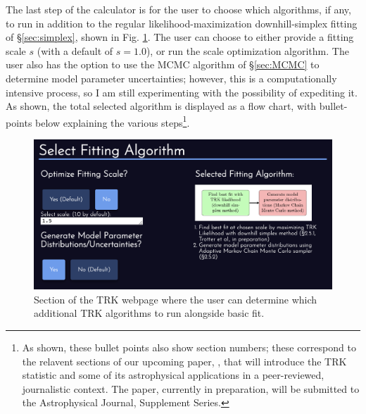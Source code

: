 The last step of the calculator is for the user to choose which algorithms, if any, to run in addition to the regular likelihood-maximization downhill-simplex fitting of \S\ref{sec:simplex}, shown in Fig. \ref{fig:websitechoosealgo}. The user can choose to either provide a fitting scale $s$ (with a default of $s=1.0$), or run the scale optimization algorithm. The user also has the option to use the MCMC algorithm of \S\ref{sec:MCMC} to determine model parameter uncertainties; however, this is a computationally intensive process, so I am still experimenting with the possibility of expediting it. As shown, the total selected algorithm is displayed as a flow chart, with bullet-points below explaining the various steps\footnote{As shown, these bullet points also show section numbers; these correspond to the relavent sections of our upcoming paper, \textcite{TRKIapjs}, that will introduce the TRK statistic and some of its astrophysical applications in a peer-reviewed, journalistic context. The paper, currently in preparation, will be submitted to the Astrophysical Journal, Supplement Series.}.
\begin{figure}
    \centering
    \includegraphics[width=1.0\linewidth]{figures/websitechoosealgo.png}
    \caption{Section of the TRK webpage where the user can determine which additional TRK algorithms to run alongside basic fit.}
    \label{fig:websitechoosealgo}
\end{figure}

